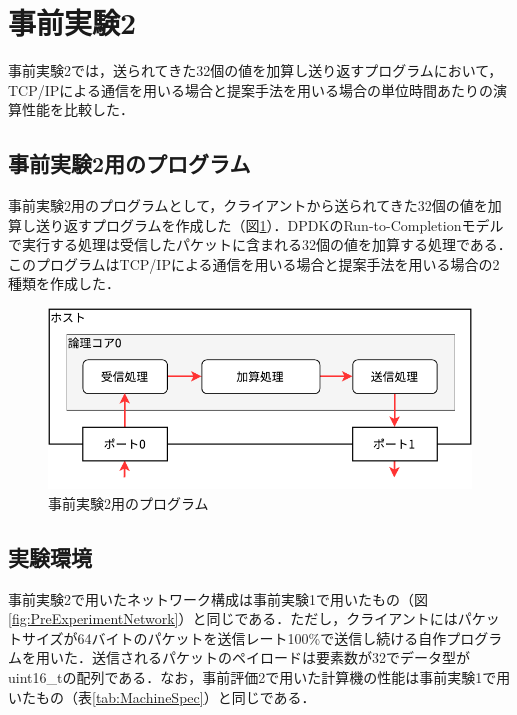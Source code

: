 \section{事前実験2}
\label{sec:PreExperimentTwo}
事前実験2では，送られてきた32個の値を加算し送り返すプログラムにおいて，TCP/IPによる通信を用いる場合と提案手法を用いる場合の単位時間あたりの演算性能を比較した．

\subsection{事前実験2用のプログラム}
事前実験2用のプログラムとして，クライアントから送られてきた32個の値を加算し送り返すプログラムを作成した（図\ref{fig:PreExperimentTwo}）．DPDKのRun-to-Completionモデルで実行する処理は受信したパケットに含まれる32個の値を加算する処理である．このプログラムはTCP/IPによる通信を用いる場合と提案手法を用いる場合の2種類を作成した．

\begin{figure}[htb]
  \centering
  \includegraphics[width=\columnwidth]{pictures/PreExperimentTwo.pdf}
  \caption{事前実験2用のプログラム}
  \label{fig:PreExperimentTwo}
\end{figure}

\subsection{実験環境}
事前実験2で用いたネットワーク構成は事前実験1で用いたもの（図\ref{fig:PreExperimentNetwork}）と同じである．ただし，クライアントにはパケットサイズが64バイトのパケットを送信レート100\%で送信し続ける自作プログラムを用いた．送信されるパケットのペイロードは要素数が32でデータ型がuint16\_tの配列である．なお，事前評価2で用いた計算機の性能は事前実験1で用いたもの（表\ref{tab:MachineSpec}）と同じである．

